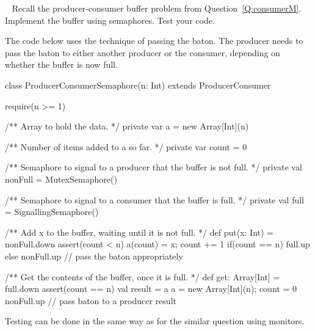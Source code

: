 \begin{question}
\Programming\ 
%
Recall the producer-consumer buffer problem from
Question~\ref{Q:consumerM}.
Implement the buffer using semaphores. 
Test your code.
\end{question}


\begin{answer}
The code below uses the technique of passing the baton.  The producer needs to
pass the baton to either another producer or the consumer, depending on
whether the buffer is now full.
%
\begin{scala}
class ProducerConsumerSemaphore(n: Int)  extends ProducerConsumer{
  require(n >= 1)

  /** Array to hold the data. */
  private var a = new Array[Int](n)

  /** Number of items added to a so far. */
  private var count = 0

  /** Semaphore to signal to a producer that the buffer is not full. */
  private val nonFull = MutexSemaphore()

  /** Semaphore to signal to a consumer that the buffer is full. */
  private val full = SignallingSemaphore()

  /** Add x to the buffer, waiting until it is not full. */
  def put(x: Int) = {
    nonFull.down
    assert(count < n)
    a(count) = x; count += 1
    if(count == n) full.up else nonFull.up // pass the baton appropriately
  }

  /** Get the contents of the buffer, once it is full. */
  def get: Array[Int] = {
    full.down
    assert(count == n)
    val result = a
    a = new Array[Int](n); count = 0
    nonFull.up // pass baton to a producer
    result
  }
}
\end{scala}

Testing can be done in the same way as for the similar question using monitors. 
\end{answer}

